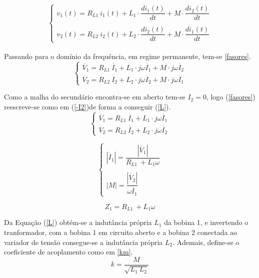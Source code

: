 \documentclass[a4paper,12pt,oneside,openany,table,xcdraw]{article}
\begin{document}
\begin{gather}\label{siseq}
\begin{cases}
v_{1}( t) =R_{L1} \ i_{1}( t) +L_{1} \cdot \dfrac{di_{1}( t)}{dt} +M\cdot \dfrac{di_{2}( t)}{dt}\\
 \\
v_{2}( t) =R_{L2} \ i_{2}( t) +L_{2} \cdot \dfrac{di_{2}( t)}{dt} +M\cdot \dfrac{di_{1}( t)}{dt}
\end{cases}
\end{gather}

Passando para o domínio da frequência, em regime permanente, tem-se \ref{fasores}.
\begin{equation}\label{fasores}
\begin{cases}
\dot{V_{1}} =R_{L1} \ \dot{I_{1}} +L_{1} \cdot j\omega \dot{I_{1}} +M\cdot j\omega \dot{I_{2}}\\
\dot{V_{2}} =R_{L2} \ \dot{I_{2}} +L_{2} \cdot j\omega \dot{I_{2}} +M\cdot j\omega \dot{I_{1}}
\end{cases}
\end{equation}

Como a malha do secundário encontra-se em aberto tem-se $\dot{I_2}=0$, logo (\ref{fasores}) reescreve-se como em (\ref{-I2})de forma a conseguir (\ref{L}).
\begin{equation}\label{-I2}
\begin{cases}
\dot{V_{1}} =R_{L1} \ \dot{I_{1}} +L_{1} \cdot j\omega \dot{I_{1}}\\
\dot{V_{2}} =R_{L2} \ \dot{I_{2}} +L_{2} \cdot j\omega \dot{I_{2}}
\end{cases}
\end{equation}


\begin{equation*}
\begin{cases}
|\dot{I_{1}} |=\dfrac{|\dot{V_{1}} |}{R_{L1} \ +L_{1} \omega }\\\\
|M|=\dfrac{|\dot{V_{2}} |}{\omega \dot{I_{1}}}
\end{cases}
\end{equation*}

\begin{equation}\label{L}
Z_1=R_{L1} \ +L_{1} \omega
\end{equation}

Da Equação (\ref{L}) obtém-se a indutância própria $L_1$ da bobina 1, e invertendo o tranformador, com a bobina 1 em circuito aberto e a bobina 2 conectada ao variador de tensão consegue-se a indutância própria $L_2$. Ademais, define-se o coeficiente de acoplamento como em \ref{km}.
\begin{equation}\label{km}
k=\dfrac{M}{\sqrt{L_1\ L_2}}
\end{equation}
\vspace{0.1cm}
\end{document}
